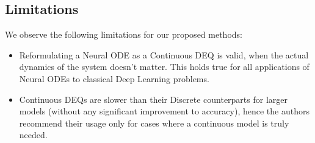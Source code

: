 \subsection{Limitations}
\label{sec:infinite_time_neural_odes_limitations}

We observe the following limitations for our proposed methods:
%
\begin{itemize}
    \item Reformulating a Neural ODE as a Continuous DEQ is valid, when the actual dynamics of the system doesn't matter. This holds true for all applications of Neural ODEs to classical Deep Learning problems.

    \item Continuous DEQs are slower than their Discrete counterparts for larger models (without any significant improvement to accuracy), hence the authors recommend their usage only for cases where a continuous model is truly needed.
\end{itemize}
%